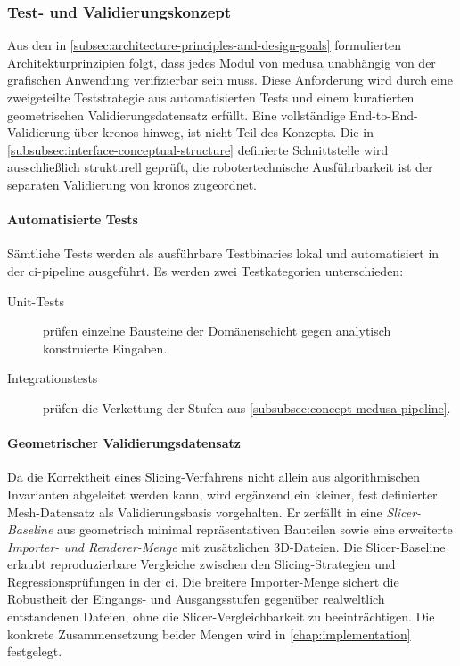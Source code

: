             \subsubsection{Test- und Validierungskonzept}\label{subsubsec:concept-medusa-testing} 
                Aus den in \cref{subsec:architecture-principles-and-design-goals} formulierten Architekturprinzipien folgt, dass jedes Modul von \ac{medusa} unabhängig von der grafischen Anwendung verifizierbar sein muss.
                Diese Anforderung wird durch eine zweigeteilte Teststrategie aus automatisierten Tests und einem kuratierten geometrischen Validierungsdatensatz erfüllt.
                Eine vollständige End-to-End-Validierung über \ac{kronos} hinweg, ist nicht Teil des Konzepts.
                Die in \cref{subsubsec:interface-conceptual-structure} definierte Schnittstelle wird ausschließlich strukturell geprüft, die robotertechnische Ausführbarkeit ist der separaten Validierung von \ac{kronos} zugeordnet.

                \paragraph{Automatisierte Tests}
                    Sämtliche Tests werden als ausführbare Testbinaries lokal und automatisiert in der \gls{ci-pipeline} ausgeführt.
                    Es werden zwei Testkategorien unterschieden:
                    \begin{description}
                        \item[Unit-Tests] prüfen einzelne Bausteine der Domänenschicht gegen analytisch konstruierte Eingaben.
                        \item[Integrationstests] prüfen die Verkettung der Stufen aus \cref{subsubsec:concept-medusa-pipeline}.
                    \end{description}

                \paragraph{Geometrischer Validierungsdatensatz}
                    Da die Korrektheit eines Slicing-Verfahrens nicht allein aus algorithmischen Invarianten abgeleitet werden kann, wird ergänzend ein kleiner, fest definierter Mesh-Datensatz als Validierungsbasis vorgehalten.
                    Er zerfällt in eine \emph{Slicer-Baseline} aus geometrisch minimal repräsentativen Bauteilen sowie eine erweiterte \emph{Importer- und Renderer-Menge} mit zusätzlichen 3D-Dateien.
                    Die Slicer-Baseline erlaubt reproduzierbare Vergleiche zwischen den Slicing-Strategien und Regressionsprüfungen in der \gls{ci}.
                    Die breitere Importer-Menge sichert die Robustheit der Eingangs- und Ausgangsstufen gegenüber realweltlich entstandenen Dateien, ohne die Slicer-Vergleichbarkeit zu beeinträchtigen.
                    Die konkrete Zusammensetzung beider Mengen wird in \cref{chap:implementation} festgelegt.

